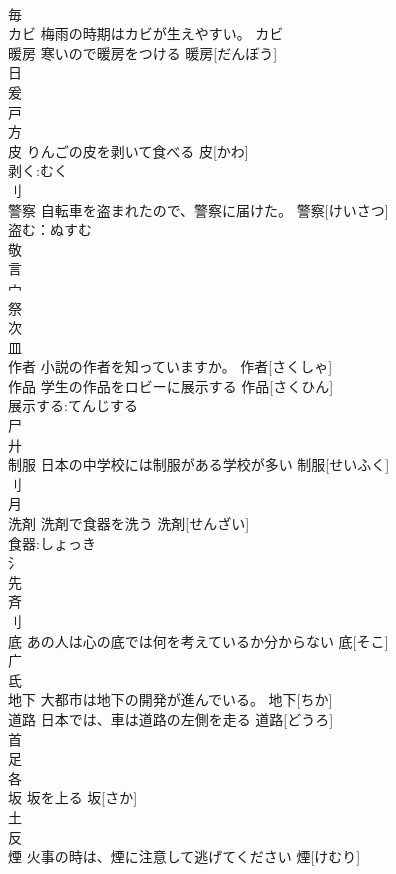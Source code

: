 \documentclass[8pt]{extreport}
\begin{document}
\begin{CJK}{UTF8}{min}
\\	毎 
\\	カビ	梅雨の時期はカビが生えやすい。	カビ			
\\	暖房	寒いので暖房をつける	暖房[だんぼう]			
\\	日 
\\	爰 
\\	戸 
\\	方 
\\	皮	りんごの皮を剥いて食べる	皮[かわ]			
\\	剥く:むく
\\	刂 
\\	警察	自転車を盗まれたので、警察に届けた。	警察[けいさつ]			
\\	盗む：ぬすむ
\\	敬 
\\	言 
\\	宀 
\\	祭 
\\	次 
\\	皿 
\\	作者	小説の作者を知っていますか。	作者[さくしゃ]			
\\	作品	学生の作品をロビーに展示する	作品[さくひん]			
\\	展示する:てんじする
\\	尸 
\\	廾 
\\	制服	日本の中学校には制服がある学校が多い	制服[せいふく]			
\\	刂 
\\	月 
\\	洗剤	洗剤で食器を洗う	洗剤[せんざい]			
\\	食器:しょっき
\\	氵 
\\	先 
\\	斉 
\\	刂 
\\	底	あの人は心の底では何を考えているか分からない	底[そこ]			
\\	广 
\\	氐 
\\	地下	大都市は地下の開発が進んでいる。	地下[ちか]			
\\	道路	日本では、車は道路の左側を走る	道路[どうろ]			
\\	首 
\\	足 
\\	各 
\\	坂	坂を上る	坂[さか]			
\\	土 
\\	反 
\\	煙	火事の時は、煙に注意して逃げてください	煙[けむり]			

\end{CJK}
\end{document}
